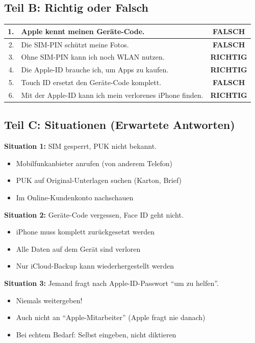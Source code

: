 \documentclass[11pt,a4paper]{article}
\begin{document}
\subsection{Teil B: Richtig oder Falsch}

\begin{tabular}{|r|l|c|}
\hline
1. & Apple kennt meinen Geräte-Code. & \textbf{FALSCH} \\
\hline
2. & Die SIM-PIN schützt meine Fotos. & \textbf{FALSCH} \\
\hline
3. & Ohne SIM-PIN kann ich noch WLAN nutzen. & \textbf{RICHTIG} \\
\hline
4. & Die Apple-ID brauche ich, um Apps zu kaufen. & \textbf{RICHTIG} \\
\hline
5. & Touch ID ersetzt den Geräte-Code komplett. & \textbf{FALSCH} \\
\hline
6. & Mit der Apple-ID kann ich mein verlorenes iPhone finden. & \textbf{RICHTIG} \\
\hline
\end{tabular}

\subsection{Teil C: Situationen (Erwartete Antworten)}

\textbf{Situation 1:} SIM gesperrt, PUK nicht bekannt.
\begin{itemize}
    \item Mobilfunkanbieter anrufen (von anderem Telefon)
    \item PUK auf Original-Unterlagen suchen (Karton, Brief)
    \item Im Online-Kundenkonto nachschauen
\end{itemize}

\textbf{Situation 2:} Geräte-Code vergessen, Face ID geht nicht.
\begin{itemize}
    \item iPhone muss komplett zurückgesetzt werden
    \item Alle Daten auf dem Gerät sind verloren
    \item Nur iCloud-Backup kann wiederhergestellt werden
\end{itemize}

\textbf{Situation 3:} Jemand fragt nach Apple-ID-Passwort ``um zu helfen''.
\begin{itemize}
    \item Niemals weitergeben!
    \item Auch nicht an ``Apple-Mitarbeiter'' (Apple fragt nie danach)
    \item Bei echtem Bedarf: Selbst eingeben, nicht diktieren
\end{itemize}
\end{document}
